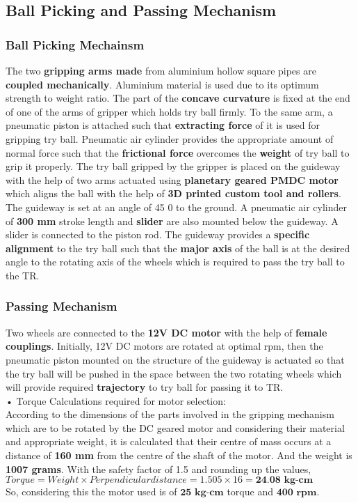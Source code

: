     \subsection{Ball Picking and Passing Mechanism}
        \subsubsection{Ball Picking Mechainsm}
            The two \textbf{gripping arms made} from aluminium hollow square pipes are \textbf{coupled mechanically}. Aluminium material is used due to its 
            optimum strength to weight ratio. The part of the \textbf{concave curvature} is fixed at the end of one of the arms of gripper which holds 
            try ball firmly. To the same arm, a pneumatic piston is attached such that \textbf{extracting force} of it is used for gripping try ball. 
            Pneumatic air cylinder provides the appropriate amount of normal force such that the \textbf{frictional force} overcomes the \textbf{weight} of try 
            ball to grip it properly. The try ball gripped by the gripper is placed on the guideway with the help of two arms actuated using 
            \textbf{planetary geared PMDC motor} which aligns the ball with the help of \textbf{3D printed custom tool and rollers}. The guideway is set at an 
            angle of 45 0 to the ground. A pneumatic air cylinder of \textbf{300 mm} stroke length and \textbf{slider} are also mounted below the guideway. A slider 
            is connected to the piston rod. The guideway provides a \textbf{specific alignment} to the try ball such that the \textbf{major axis} of the ball is at 
            the desired angle to the rotating axis of the wheels which is required to pass the try ball to the TR.

        \subsubsection{Passing Mechanism}
            Two wheels are connected to the \textbf{12V DC motor} with the help of \textbf{female couplings}. Initially, 12V DC motors are rotated at optimal rpm, 
            then the pneumatic piston mounted on the structure of the guideway is actuated so that the try ball will be pushed in the space between 
            the two rotating wheels which will provide required \textbf{trajectory} to try ball for passing it to TR.\\
            • Torque Calculations required for motor selection:\\
            According to the dimensions of the parts involved in the gripping mechanism which are to be rotated by the DC geared motor and considering 
            their material and appropriate weight, it is calculated that their centre of mass occurs at a distance of \textbf{160 mm} from the centre of the shaft 
            of the motor. And the weight is \textbf{1007 grams}. With the safety factor of 1.5 and rounding up the values,\\
            $Torque = Weight \times Perpendicular distance = 1.505 \times 16 = \textbf{24.08 kg-cm}$\\
            So, considering this the motor used is of $\textbf{25 kg-cm}$ torque and $\textbf{400 rpm}$.

